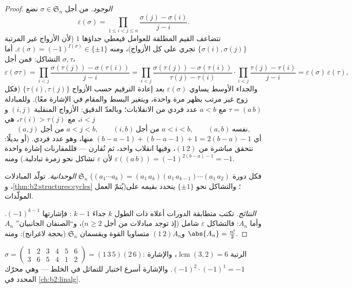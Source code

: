 \begin{proof}
\emph{الوجود.} من أجل $\sigma \in \mathfrak{S}_n$ نضع
\[
\varepsilon(\sigma)
= \prod_{1 \leq i < j \leq n}
\frac{\sigma(j) - \sigma(i)}{j - i} .
\]
تتضاعف القيم المطلقة للعوامل فيعطي جداؤها $1$ (لأن الأزواج غير
المرتبة $\{\sigma(i), \sigma(j)\}$ تجري على كل الأزواج)، ومنه
$\varepsilon(\sigma) = (-1)^{I(\sigma)} \in \{\pm1\}$. أما التشاكل: فمن أجل
$\sigma, \tau$،
\[
\varepsilon(\sigma\tau)
= \prod_{i<j} \frac{\sigma(\tau(j)) - \sigma(\tau(i))}{j - i}
= \prod_{i<j} \frac{\sigma(\tau(j)) - \sigma(\tau(i))}{\tau(j) -
\tau(i)} \cdot \prod_{i<j} \frac{\tau(j) - \tau(i)}{j - i}
= \varepsilon(\sigma)\,\varepsilon(\tau),
\]
والجداء الأوسط يساوي $\varepsilon(\sigma)$ بعد إعادة الترقيم حسب
الأزواج $\{\tau(i), \tau(j)\}$ (فكل زوج غير مرتب يظهر مرة واحدة،
ويتغير البسط والمقام في الإشارة معًا). وللمبادلة
$\tau = (a\,b)$ مع $a < b$ عدد فردي من الانقلابات؛
وبالعدّ الدقيق: الأزواج المنقلبة $(i, j)$ و$i < j$، مع
$\tau(i) > \tau(j)$، هي
\[
(a, j) \ \text{من أجل } a < j < b, \qquad
(i, b) \ \text{من أجل } a < i < b, \qquad
(a, b) \ \text{نفسه},
\]
أي $(b - a - 1) + (b - a - 1) + 1 = 2(b - a) - 1$ منها،
وهو عدد فردي. (أو بديلًا: نتحقق مباشرة من $(1\,2)$، وفيها انقلاب
واحد، ثم نُقارن --- فللمقارنات إشارة واحدة
لأن $\varepsilon$ تشاكل نحو زمرة تبادلية.) ومنه
$\varepsilon((a\,b)) = (-1)^{2(b-a)-1} = -1$.

\emph{الوحدانية.} تولّد المبادلات $\mathfrak{S}_n$ (فكل
دورة $(a_1\cdots a_k) = (a_1\,a_k)(a_1\,a_{k-1})\cdots(a_1\,a_2)$،
و\cref{thm:b2:structures:cycles} يُتمّ العمل)؛ والتشاكل نحو
$\{\pm1\}$ يتحدد بقيمه على المولّدات.

\emph{النتائج.} تكتب متطابقة الدورات أعلاه  ذات الطول $k$ جداءَ
$k - 1$ : فإشارتها $(-1)^{k-1}$. وأما $A_n$: فالتشاكل
$\varepsilon$ شامل (إذ توجد مبادلات من أجل $n \geq 2$)،
و``الصنفان الجانبيان'' $A_n$ و$(1\,2)A_n$ متساويا القوة ويقسمان
$\mathfrak{S}_n$ (بحجة لاغرانج): ومنه $\abs{A_n} =
\frac{n!}{2}$.
\end{proof}

\begin{example}\label{ex:b2:structures:snexample}
$\sigma = \begin{pmatrix} 1&2&3&4&5&6\\ 3&6&5&4&1&2 \end{pmatrix}
= (1\,3\,5)(2\,6)$: الرتبة $\operatorname{lcm}(3,2) = 6$، والإشارة
$(-1)^{2}\cdot(-1)^{1} = -1$. والإشارة أسرع اختبار
للتماثل في الخلط --- وهي محرّك المحدد في
\cref{ch:b2:linalg}.
\end{example}

